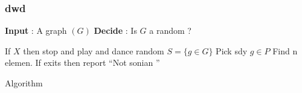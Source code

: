 \documentclass{beamer}
\begin{document}

\begin{frame}
\frametitle{dwd}

\begingroup
\small
\begin{algorithm}[H]
\SetAlgoLined
\textbf{Input} : A graph $(G)$\;
\textbf{Decide} : Is $G$ a random ? \\
\vspace{0.3cm}

If $X$ then stop and play and dance random \;
$S = \{g \in G \}$\;
Pick sdy $g \in P  $\;
Find n elemen. If  exits  then report   ``Not sonian ''\;



 \caption{Algorithm}
 \label{algo6}
\end{algorithm}
\endgroup

\end{frame}
\end{document}
